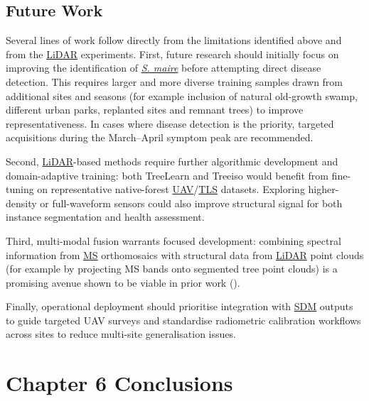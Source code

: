 \documentclass[
]{scrreprt}
\begin{document}
\section{Future Work}\label{future-work}

Several lines of work follow directly from the limitations identified
above and from the \hyperref[acronyms_LiDAR]{LiDAR} experiments. First,
future research should initially focus on improving the identification
of \hyperref[acronyms_SM]{\emph{S. maire}} before attempting direct
disease detection. This requires larger and more diverse training
samples drawn from additional sites and seasons (for example inclusion
of natural old-growth swamp, different urban parks, replanted sites and
remnant trees) to improve representativeness. In cases where disease
detection is the priority, targeted acquisitions during the March--April
symptom peak are recommended.

Second, \hyperref[acronyms_LiDAR]{LiDAR}-based methods require further
algorithmic development and domain-adaptive training: both TreeLearn and
Treeiso would benefit from fine-tuning on representative native-forest
\hyperref[acronyms_UAV]{UAV}/\hyperref[acronyms_TLS]{TLS} datasets.
Exploring higher-density or full-waveform sensors could also improve
structural signal for both instance segmentation and health assessment.

Third, multi-modal fusion warrants focused development: combining
spectral information from \hyperref[acronyms_MS]{MS} orthomosaics with
structural data from \hyperref[acronyms_LiDAR]{LiDAR} point clouds (for
example by projecting MS bands onto segmented tree point clouds) is a
promising avenue shown to be viable in prior work
().

Finally, operational deployment should prioritise integration with
\hyperref[acronyms_SDM]{SDM} outputs to guide targeted UAV surveys and
standardise radiometric calibration workflows across sites to reduce
multi-site generalisation issues.

\chapter{Chapter 6 Conclusions}\label{conclusions}
\end{document}
